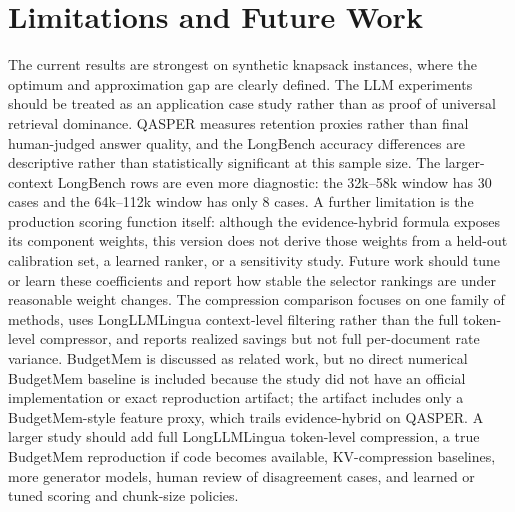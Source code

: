\documentclass[conference]{IEEEtran}
\begin{document}
\section{Limitations and Future Work}
The current results are strongest on synthetic knapsack instances, where the optimum and approximation gap are clearly defined. The LLM experiments should be treated as an application case study rather than as proof of universal retrieval dominance. QASPER measures retention proxies rather than final human-judged answer quality, and the LongBench accuracy differences are descriptive rather than statistically significant at this sample size. The larger-context LongBench rows are even more diagnostic: the 32k--58k window has 30 cases and the 64k--112k window has only 8 cases. A further limitation is the production scoring function itself: although the evidence-hybrid formula exposes its component weights, this version does not derive those weights from a held-out calibration set, a learned ranker, or a sensitivity study. Future work should tune or learn these coefficients and report how stable the selector rankings are under reasonable weight changes. The compression comparison focuses on one family of methods, uses LongLLMLingua context-level filtering rather than the full token-level compressor, and reports realized savings but not full per-document rate variance. BudgetMem is discussed as related work, but no direct numerical BudgetMem baseline is included because the study did not have an official implementation or exact reproduction artifact; the artifact includes only a BudgetMem-style feature proxy, which trails evidence-hybrid on QASPER. A larger study should add full LongLLMLingua token-level compression, a true BudgetMem reproduction if code becomes available, KV-compression baselines, more generator models, human review of disagreement cases, and learned or tuned scoring and chunk-size policies.
\end{document}
